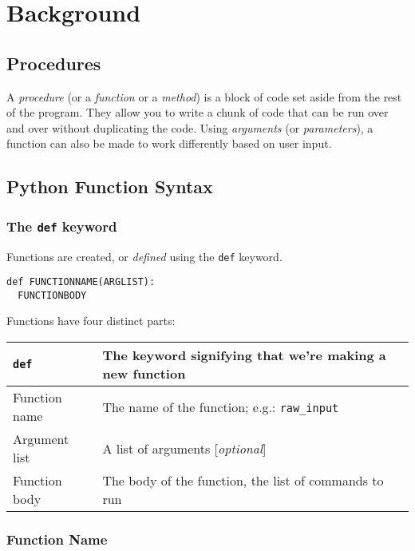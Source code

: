 \documentclass[11pt, letterpaper]{article}
\begin{document}

\section*{Background}

\subsection*{Procedures}

A {\em procedure} (or a {\em function} or a {\em method}) is a block of code set aside from the rest of the program. They allow you to write a chunk of code that can be run over and over without duplicating the code. Using {\em arguments} (or {\em parameters}), a function can also be made to work differently based on user input.

\subsection*{Python Function Syntax}

\subsubsection*{The {\tt def} keyword}

Functions are created, or {\em defined} using the {\tt def} keyword.

\begin{lstlisting}
def FUNCTIONNAME(ARGLIST):
  FUNCTIONBODY
\end{lstlisting}

Functions have four distinct parts:

\begin{tabular}{l|l}
	{\tt def}			&	The keyword signifying that we're making a new function\\
	\hline
	Function name		&	The name of the function; e.g.: {\tt raw\_input}\\
	\hline
	Argument list		&	A list of arguments [{\em optional}]\\
	\hline
	Function body		&	The body of the function, the list of commands to run\\
\end{tabular}

\subsubsection*{Function Name}
\end{document}
